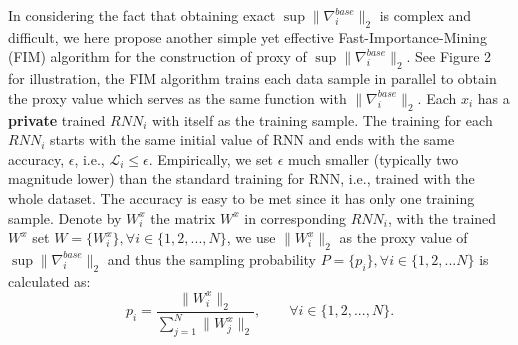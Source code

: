 \documentclass[twoside,leqno,twocolumn]{article}
\begin{document}
In considering the fact that obtaining exact $\sup \|\nabla^{base}_i\|_2$ is complex and difficult, we here propose another simple yet effective Fast-Importance-Mining (FIM) algorithm for the construction of proxy of $\sup \|\nabla^{base}_i\|_2$. See Figure 2 for illustration, the FIM algorithm trains each data sample in parallel to obtain the proxy value which serves as the same function with $\|\nabla^{base}_i\|_2$. Each $x_i$ has a \textbf{private} trained $RNN_i$ with itself as the  training sample. The training for each $RNN_i$ starts with the same initial value of RNN and ends with the same accuracy, $\epsilon$, i.e., $\mathcal{L}_i\le \epsilon$. Empirically, we set $\epsilon$ much smaller (typically two magnitude lower) than the standard training for RNN, i.e., trained with the whole dataset. The accuracy is easy to be met since it has only one training sample. Denote by $W^x_i$ the matrix $W^x$ in corresponding $RNN_i$, with the trained $W^x$ set $W=\{W^x_i\}, \forall i \in \{1,2,...,N\}$, we use $\|W^x_i\|_2$ as the proxy value of $\sup \|\nabla^{base}_i\|_2$ and thus the sampling probability $P=\{p_i\},\forall i \in \{1,2,...N\}$ is calculated as:
\begin{equation}
\label{pi}
	p_i=\frac{\|W^x_i\|_2}{\sum_{j=1}^{N}\|W^x_j\|_2}, \qquad \forall i \in \{1,2,...,N\}.
\end{equation}
\end{document}
